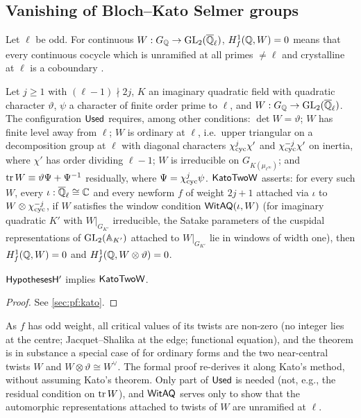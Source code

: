 \subsection{Vanishing of Bloch--Kato Selmer groups}\label{sec:window:kato}

Let $\ell$ be odd. For continuous $W:G_{\mathbb{Q}}\to\operatorname{GL}_2(\overline{\mathbb{Q}}_\ell)$, $H^1_{f}(\mathbb{Q},W)=0$ means that every continuous cocycle
which is unramified at all primes $\ne\ell$ and crystalline at $\ell$ is a coboundary \cite{BlochKato1990}.

\begin{definition}\label{def:window:kato}
Let $j\ge1$ with $(\ell-1)\nmid2j$, $K$ an imaginary quadratic field with quadratic character $\vartheta$, $\psi$ a
character of finite order prime to $\ell$, and $W:G_{\mathbb{Q}}\to\operatorname{GL}_2(\overline{\mathbb{Q}}_\ell)$. The configuration $\mathsf{Used}$ requires,
among other conditions: $\det W=\vartheta$; $W$ has finite level away from $\ell$; $W$ is ordinary at $\ell$, i.e.\ upper
triangular on a decomposition group at $\ell$ with diagonal characters $\chi_{\mathrm{cyc}}^{j}\chi'$ and $\chi_{\mathrm{cyc}}^{-j}\chi'$
on inertia, where $\chi'$ has order dividing $\ell-1$; $W$ is irreducible on $G_{K(\mu_{\ell^\infty})}$; and
$\operatorname{tr} W\equiv\vartheta\Psi+\Psi^{-1}$ residually, where $\Psi=\chi_{\mathrm{cyc}}^j\psi$. $\mathsf{KatoTwoW}$ asserts: for every
such $W$, every $\iota:\overline{\mathbb{Q}}_\ell\cong\mathbb{C}$ and
every newform $f$ of weight $2j+1$ attached via $\iota$ to $W\otimes\chi_{\mathrm{cyc}}^{-j}$, if $W$ satisfies the window
condition $\mathsf{WitAQ}(\iota,W)$ (for imaginary quadratic $K'$ with $W|_{G_{K'}}$ irreducible, the Satake
parameters of the cuspidal representations of $\operatorname{GL}_2(\mathbb{A}_{K'})$ attached to $W|_{G_{K'}}$ lie in windows of width
one), then $H^1_{f}(\mathbb{Q},W)=0$ and $H^1_{f}(\mathbb{Q},W\otimes\vartheta)=0$.
\end{definition}

\begin{theorem}\Fmark\label{thm:kato}
$\mathsf{HypothesesH'}$ implies $\mathsf{KatoTwoW}$.
\end{theorem}
\begin{proof}See \cref{sec:pf:kato}.
\end{proof}


As $f$ has odd weight, all critical values of its twists are non-zero (no integer lies at the centre;
Jacquet--Shalika \cite{JacquetShalika1976} at the edge; functional equation), and the theorem is in substance a
special case of \cite[Thm.~14.2]{Kato2004} for ordinary forms and the two near-central twists $W$ and
$W\otimes\vartheta\cong W^\vee$. The formal proof re-derives it along Kato's method, without assuming Kato's theorem.
Only part of $\mathsf{Used}$ is needed (not, e.g., the residual condition on $\operatorname{tr} W$), and $\mathsf{WitAQ}$ serves
only to show that the automorphic representations attached to twists of $W$ are unramified at $\ell$.

